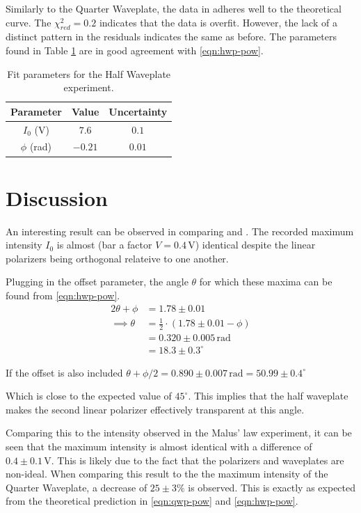 \documentclass[aip, cp, amsmath, amssymb, reprint]{revtex4-2}
\begin{document}
            Similarly to the Quarter Waveplate, the data in  adheres well to the theoretical curve. The $\chi_{red}^2 = 0.2$ indicates that the data is overfit. However, the lack of a distinct pattern in the residuals indicates the same as before. The parameters found in Table \ref{tab:hwp} are in good agreement with \eqref{eqn:hwp-pow}.
            \begin{table}[H]
                \centering
                \begin{tabular}{c|c|c}
                    \bfseries Parameter & \bfseries Value & \bfseries Uncertainty \\
                    \hline
                    $I_0$ (V) & $7.6$ & $0.1$ \\
                    $\phi$ (rad) & $-0.21$ & $0.01$ 
                \end{tabular}
                \caption{Fit parameters for the Half Waveplate experiment.}
                \label{tab:hwp}
            \end{table}

    
    \section{Discussion}
        An interesting result can be observed in comparing  and . The recorded maximum intensity $I_0$ is almost (bar a factor $V = 0.4\,\text{V}$) identical despite the linear polarizers being orthogonal relateive to one another.
        
        Plugging in the offset parameter, the angle $\theta$ for which these maxima can be found from \eqref{eqn:hwp-pow}.
        \begin{align*}
            2\theta + \phi &= 1.78 \pm 0.01 \\
            \implies \theta &= \frac{1}{2}\cdot(1.78 \pm 0.01 - \phi) \\
            &= 0.320 \pm 0.005\,\text{rad} \\
            &= 18.3 \pm 0.3^\circ
        \end{align*}

        If the offset is also included $\theta+\phi/2 =0.890\pm0.007\,\text{rad}=50.99\pm0.4^\circ$

        Which is close to the expected value of $45^\circ$. This implies that the half waveplate makes the second linear polarizer effectively transparent at this angle.

        Comparing this to the intensity observed in the Malus' law experiment, it can be seen that the maximum intensity is almost identical with a difference of $0.4\pm0.1\,\text{V}$. This is likely due to the fact that the polarizers and waveplates are non-ideal. When comparing this result to the the maximum intensity of the Quarter Waveplate, a decrease of $25\pm3\%$ is observed. This is exactly as expected from the theoretical prediction in \eqref{eqn:qwp-pow} and \eqref{eqn:hwp-pow}.
\end{document}
